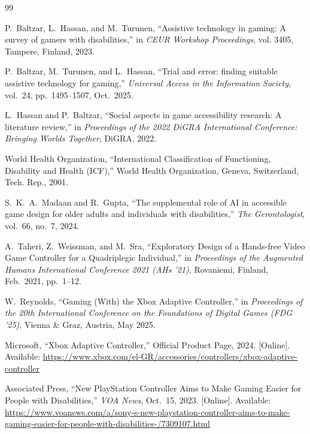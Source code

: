 \documentclass[twoside, a4paper, 11pt]{article}
\begin{document}
\begin{thebibliography}{99}

P.~Baltzar, L.~Hassan, and M.~Turunen, ``Assistive technology in gaming: A survey of gamers with disabilities,'' in \emph{CEUR Workshop Proceedings}, vol. 3405, Tampere, Finland, 2023.

P.~Baltzar, M.~Turunen, and L.~Hassan, ``Trial and error: finding suitable assistive technology for gaming,'' \emph{Universal Access in the Information Society}, vol.~24, pp.~1495--1507, Oct.~2025.

L.~Hassan and P.~Baltzar, ``Social aspects in game accessibility research: A literature review,'' in \emph{Proceedings of the 2022 DiGRA International Conference: Bringing Worlds Together}, DiGRA, 2022.

World Health Organization, ``International Classification of Functioning, Disability and Health (ICF),'' World Health Organization, Geneva, Switzerland, Tech. Rep., 2001.

S.~K.~A.~Madaan and R.~Gupta, ``The supplemental role of AI in accessible game design for older adults and individuals with disabilities,'' \emph{The Gerontologist}, vol.~66, no.~7, 2024.

A.~Taheri, Z.~Weissman, and M.~Sra, ``Exploratory Design of a Hands-free Video Game Controller for a Quadriplegic Individual,'' in \emph{Proceedings of the Augmented Humans International Conference 2021 (AHs '21)}, Rovaniemi, Finland, Feb.~2021, pp.~1--12.

W.~Reynolds, ``Gaming (With) the Xbox Adaptive Controller,'' in \emph{Proceedings of the 20th International Conference on the Foundations of Digital Games (FDG '25)}, Vienna \& Graz, Austria, May 2025.

Microsoft, ``Xbox Adaptive Controller,'' Official Product Page, 2024. [Online]. Available: \url{https://www.xbox.com/el-GR/accessories/controllers/xbox-adaptive-controller}

Associated Press, ``New PlayStation Controller Aims to Make Gaming Easier for People with Disabilities,'' \emph{VOA News}, Oct.~15, 2023. [Online]. Available: \url{https://www.voanews.com/a/sony-s-new-playstation-controller-aims-to-make-gaming-easier-for-people-with-disabilities-/7309107.html}


\end{thebibliography}
\end{document}
